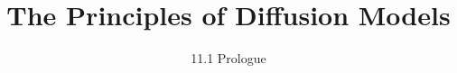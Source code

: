 ﻿%

\title{The Principles of Diffusion Models}
\subtitle{11.1 Prologue}


\begin{frame}
    \titlepage
\end{frame}


